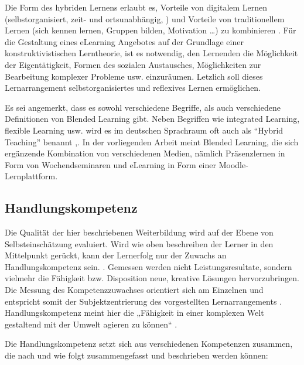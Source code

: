 \documentclass[12pt,smallheadings, bibliography=totoc]{scrartcl}
\begin{document}
Die Form des hybriden Lernens erlaubt es, Vorteile von digitalem Lernen
(selbstorganisiert, zeit- und ortsunabhängig, ) und Vorteile von
traditionellem Lernen (sich kennen lernen, Gruppen bilden, Motivation
\ldots) zu kombinieren \parencite{Zumbach2010}. Für die Gestaltung eines
eLearning Angebotes auf der Grundlage einer konstruktivistischen
Lerntheorie, ist es notwendig, den Lernenden die Möglichkeit der
Eigentätigkeit, Formen des sozialen Austausches, Möglichkeiten zur
Bearbeitung komplexer Probleme usw. einzuräumen.
Letzlich soll dieses Lernarrangement
selbstorganisiertes und reflexives Lernen ermöglichen.

Es sei angemerkt, dass es sowohl verschiedene Begriffe, als auch
verschiedene Definitionen von Blended Learning gibt. Neben Begriffen wie
integrated Learning, flexible Learning usw. wird es im deutschen
Sprachraum oft auch als \enquote{Hybrid Teaching} benannt
\parencite{Oliver2005},\parencite{kerres2001multimediale}. In der
vorliegenden Arbeit meint Blended Learning, die sich ergänzende
Kombination von verschiedenen Medien, nämlich Präsenzlernen in Form von
Wochendseminaren und eLearning in Form einer Moodle-Lernplattform.

\subsection{Handlungskompetenz}\label{handlungskompetenz}

Die Qualität der hier beschriebenen Weiterbildung wird auf der Ebene von
Selbsteinschätzung evaluiert. Wird wie oben beschreiben der Lerner in
den Mittelpunkt gerückt, kann der Lernerfolg nur der Zuwachs an
Handlungskompetenz sein. \parencite[4]{Ehlers2002}. Gemessen werden
nicht Leistungsresultate, sondern vielmehr die Fähigkeit bzw.
Disposition neue, kreative Lösungen hervorzubringen. Die Messung des
Kompetenzzuwachses orientiert sich am Einzelnen und entspricht somit der
Subjektzentrierung des vorgestellten Lernarrangements
\parencite{ErpenbeckRosenstiel200305}. Handlungskompetenz meint hier die
„Fähigkeit in einer komplexen Welt gestaltend mit der Umwelt agieren zu
können`` \parencite[4]{Ehlers2002}.

Die Handlungskompetenz setzt sich aus verschiedenen Kompetenzen
zusammen, die nach \textcite{ErpenbeckRosenstiel200305} und
\textcite{Braun2008} wie folgt zusammengefasst und beschrieben werden
können:
\end{document}
